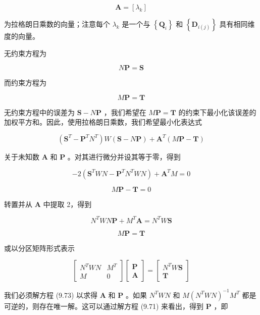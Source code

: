 \documentclass[../main.tex]{subfiles}
\begin{document}
\[
\mathbf{A} = \left\lbrack  {\lambda }_{k}\right\rbrack
\]

为拉格朗日乘数的向量；注意每个 \({\lambda }_{k}\) 是一个与 \(\left\{  {\mathbf{Q}}_{i}\right\}\) 和 \(\left\{  {\mathbf{D}}_{i\left( j\right) }\right\}\) 具有相同维度的向量。

无约束方程为

\[
N\mathbf{P} = \mathbf{S}
\]

而约束方程为

\[
M\mathbf{P} = \mathbf{T}
\]

无约束方程中的误差为 \(\mathbf{S} - N\mathbf{P}\) ，我们希望在 \(M\mathbf{P} = \mathbf{T}\) 的约束下最小化该误差的加权平方和。因此，使用拉格朗日乘数，我们希望最小化表达式

\[
\left( {{\mathbf{S}}^{T} - {\mathbf{P}}^{T}{N}^{T}}\right) W\left( {\mathbf{S} - N\mathbf{P}}\right)  + {\mathbf{A}}^{T}\left( {M\mathbf{P} - \mathbf{T}}\right)
\]

关于未知数 \(\mathbf{A}\) 和 \(\mathbf{P}\) 。对其进行微分并设其等于零，得到

\[
- 2\left( {{\mathbf{S}}^{T}{WN} - {\mathbf{P}}^{T}{N}^{T}{WN}}\right)  + {\mathbf{A}}^{T}M = 0
\]

\[
M\mathbf{P} - \mathbf{T} = 0
\]

转置并从 \(\mathbf{A}\) 中提取 2，得到

\[
{N}^{T}{WN}\mathbf{P} + {M}^{T}\mathbf{A} = {N}^{T}W\mathbf{S} \tag{9.71}
\]

\[
M\mathbf{P} = \mathbf{T} \tag{9.72}
\]

或以分区矩阵形式表示

\[
\left\lbrack  \begin{matrix} {N}^{T}{WN} & {M}^{T} \\  M & 0 \end{matrix}\right\rbrack  \left\lbrack  \begin{array}{l} \mathbf{P} \\  \mathbf{A} \end{array}\right\rbrack   = \left\lbrack  \begin{matrix} {N}^{T}W\mathbf{S} \\  \mathbf{T} \end{matrix}\right\rbrack   \tag{9.73}
\]

我们必须解方程 (9.73) 以求得 \(\mathbf{A}\) 和 \(\mathbf{P}\) 。如果 \({N}^{T}{WN}\) 和 \(M{\left( {N}^{T}WN\right) }^{-1}{M}^{T}\) 都是可逆的，则存在唯一解。这可以通过解方程 (9.71) 来看出，得到 \(\mathbf{P}\) ，即
\end{document}
